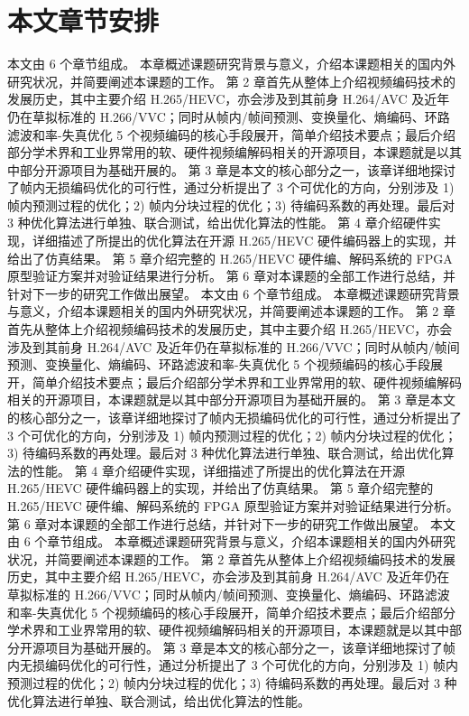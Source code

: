 \section{本文章节安排}
本文由 6 个章节组成。
本章概述课题研究背景与意义，介绍本课题相关的国内外研究状况，并简要阐述本课题的工作。
第 2 章首先从整体上介绍视频编码技术的发展历史，其中主要介绍 H.265/HEVC，亦会涉及到其前身 H.264/AVC 及近年仍在草拟标准的 H.266/VVC；同时从帧内/帧间预测、变换量化、熵编码、环路滤波和率-失真优化 5 个视频编码的核心手段展开，简单介绍技术要点；最后介绍部分学术界和工业界常用的软、硬件视频编解码相关的开源项目，本课题就是以其中部分开源项目为基础开展的。
第 3 章是本文的核心部分之一，该章详细地探讨了帧内无损编码优化的可行性，通过分析提出了 3 个可优化的方向，分别涉及 1) 帧内预测过程的优化；2) 帧内分块过程的优化；3) 待编码系数的再处理。最后对 3 种优化算法进行单独、联合测试，给出优化算法的性能。
第 4 章介绍硬件实现，详细描述了所提出的优化算法在开源 H.265/HEVC 硬件编码器上的实现，并给出了仿真结果。
第 5 章介绍完整的 H.265/HEVC 硬件编、解码系统的 FPGA 原型验证方案并对验证结果进行分析。
第 6 章对本课题的全部工作进行总结，并针对下一步的研究工作做出展望。
本文由 6 个章节组成。
本章概述课题研究背景与意义，介绍本课题相关的国内外研究状况，并简要阐述本课题的工作。
第 2 章首先从整体上介绍视频编码技术的发展历史，其中主要介绍 H.265/HEVC，亦会涉及到其前身 H.264/AVC 及近年仍在草拟标准的 H.266/VVC；同时从帧内/帧间预测、变换量化、熵编码、环路滤波和率-失真优化 5 个视频编码的核心手段展开，简单介绍技术要点；最后介绍部分学术界和工业界常用的软、硬件视频编解码相关的开源项目，本课题就是以其中部分开源项目为基础开展的。
第 3 章是本文的核心部分之一，该章详细地探讨了帧内无损编码优化的可行性，通过分析提出了 3 个可优化的方向，分别涉及 1) 帧内预测过程的优化；2) 帧内分块过程的优化；3) 待编码系数的再处理。最后对 3 种优化算法进行单独、联合测试，给出优化算法的性能。
第 4 章介绍硬件实现，详细描述了所提出的优化算法在开源 H.265/HEVC 硬件编码器上的实现，并给出了仿真结果。
第 5 章介绍完整的 H.265/HEVC 硬件编、解码系统的 FPGA 原型验证方案并对验证结果进行分析。
第 6 章对本课题的全部工作进行总结，并针对下一步的研究工作做出展望。
本文由 6 个章节组成。
本章概述课题研究背景与意义，介绍本课题相关的国内外研究状况，并简要阐述本课题的工作。
第 2 章首先从整体上介绍视频编码技术的发展历史，其中主要介绍 H.265/HEVC，亦会涉及到其前身 H.264/AVC 及近年仍在草拟标准的 H.266/VVC；同时从帧内/帧间预测、变换量化、熵编码、环路滤波和率-失真优化 5 个视频编码的核心手段展开，简单介绍技术要点；最后介绍部分学术界和工业界常用的软、硬件视频编解码相关的开源项目，本课题就是以其中部分开源项目为基础开展的。
第 3 章是本文的核心部分之一，该章详细地探讨了帧内无损编码优化的可行性，通过分析提出了 3 个可优化的方向，分别涉及 1) 帧内预测过程的优化；2) 帧内分块过程的优化；3) 待编码系数的再处理。最后对 3 种优化算法进行单独、联合测试，给出优化算法的性能。
